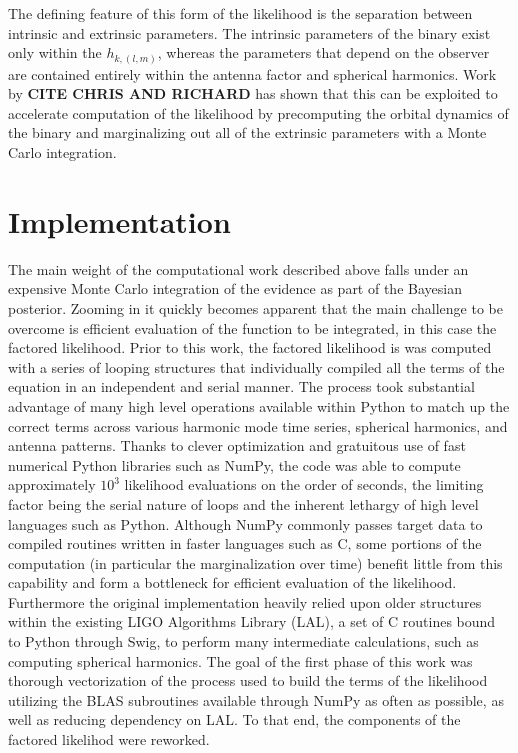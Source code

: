 \documentclass[paper=a4, fontsize=11pt]{scrartcl} %
\numberwithin{equation}{section} %
\numberwithin{figure}{section} %
\numberwithin{table}{section} %
\begin{document}
The defining feature of this form of the likelihood is the separation between intrinsic and extrinsic parameters. The intrinsic parameters of the binary exist only within the $h_{k,(l,m)}$, whereas the parameters that depend on the observer are contained entirely within the antenna factor and spherical harmonics. Work by \textbf{CITE CHRIS AND RICHARD} has shown that this can be exploited to accelerate computation of the likelihood by precomputing the orbital dynamics of the binary and marginalizing out all of the extrinsic parameters with a Monte Carlo integration. 

\section{Implementation}
The main weight of the computational work described above falls under an expensive Monte Carlo integration of the evidence as part of the Bayesian posterior. Zooming in it quickly becomes apparent that the main challenge to be overcome is efficient evaluation of the function to be integrated, in this case the factored likelihood. Prior to this work, the factored likelihood is was computed with a series of looping structures that individually compiled all the terms of the equation in an independent and serial manner. The process took substantial advantage of many high level operations available within Python to match up the correct terms across various harmonic mode time series, spherical harmonics, and antenna patterns. Thanks to clever optimization and gratuitous use of fast numerical Python libraries such as NumPy, the code was able to compute approximately $10^3$ likelihood evaluations on the order of seconds, the limiting factor being the serial nature of loops and the inherent lethargy of high level languages such as Python. Although NumPy commonly passes target data to compiled routines written in faster languages such as C, some portions of the computation (in particular the marginalization over time) benefit little from this capability and form a bottleneck for efficient evaluation of the likelihood. Furthermore the original implementation heavily relied upon older structures within the existing LIGO Algorithms Library (LAL), a set of C routines bound to Python through Swig, to perform many intermediate calculations, such as computing spherical harmonics. The goal of the first phase of this work was thorough vectorization of the process used to build the terms of the likelihood utilizing the BLAS subroutines available through NumPy as often as possible, as well as reducing dependency on LAL. To that end, the components of the factored likelihod were reworked. 
\end{document}
